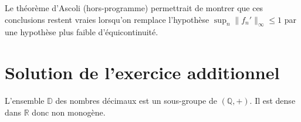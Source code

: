 Le théorème d'Ascoli (hors-programme) permettrait de montrer que ces conclusions restent vraies lorsqu'on remplace l'hypothèse $\sup_n \|f_n'\|_\infty \leqslant 1$ par une hypothèse plus faible d'équicontinuité.

\section{Solution de l'exercice additionnel}

L'ensemble $\mathbb D$ des nombres décimaux est un sous-groupe de $(\mathbb Q,+)$. Il est dense dans $\mathbb R$ donc non monogène. 